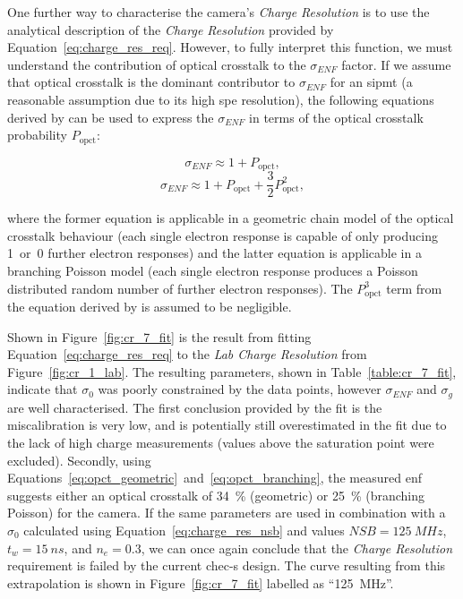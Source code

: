 One further way to characterise the camera's \textit{Charge Resolution} is to use the analytical description of the \textit{Charge Resolution} provided by Equation~\ref{eq:charge_res_req}. However, to fully interpret this function, we must understand the contribution of optical crosstalk to the $\sigma_{ENF}$ factor. If we assume that optical crosstalk is the dominant contributor to $\sigma_{ENF}$ for an \gls{sipmt} (a reasonable assumption due to its high \gls{spe} resolution), the following equations derived by \textcite{Vinogradov2012} can be used to express the $\sigma_{ENF}$ in terms of the optical crosstalk probability $P_\text{opct}$:
\begin{minipage}{\textwidth}
\begin{equation} \label{eq:opct_geometric}
\sigma_{ENF} \approx 1 + P_\text{opct},
\end{equation}
\begin{equation} \label{eq:opct_branching}
\sigma_{ENF} \approx 1 + P_\text{opct} + \frac{3}{2} P_\text{opct}^2,
\end{equation}
\end{minipage}
where the former equation is applicable in a geometric chain model of the optical crosstalk behaviour (each single electron response is capable of only producing 1~or~0 further electron responses) and the latter equation is applicable in a branching Poisson model (each single electron response produces a Poisson distributed random number of further electron responses). The $P_\text{opct}^3$ term from the equation derived by \textcite{Vinogradov2012} is assumed to be negligible.

Shown in Figure~\ref{fig:cr_7_fit} is the result from fitting Equation~\ref{eq:charge_res_req} to the \textit{Lab Charge Resolution} from Figure~\ref{fig:cr_1_lab}. The resulting parameters, shown in Table~\ref{table:cr_7_fit}, indicate that $\sigma_0$ was poorly constrained by the data points, however $\sigma_{ENF}$ and $\sigma_g$ are well characterised. The first conclusion provided by the fit is the miscalibration is very low, and is potentially still overestimated in the fit due to the lack of high charge measurements (values above the saturation point were excluded). Secondly, using Equations~\ref{eq:opct_geometric}~and~\ref{eq:opct_branching}, the measured \gls{enf} suggests either an optical crosstalk of \SI{34}{\percent} (geometric) or \SI{25}{\percent} (branching Poisson) for the camera. If the same parameters are used in combination with a $\sigma_0$ calculated using Equation~\ref{eq:charge_res_nsb} and values $\mathit{NSB} = \SI{125}{MHz}$, $t_w = \SI{15}{ns}$, and $n_e = 0.3$, we can once again conclude that the \textit{Charge Resolution} requirement is failed by the current \gls{chec-s} design. The curve resulting from this extrapolation is shown in Figure~\ref{fig:cr_7_fit} labelled as ``\SI{125}{MHz}''.

